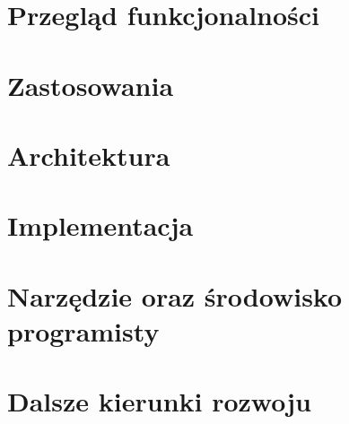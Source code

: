 \documentclass[a4paper]{article}
\begin{document}
\section{Przegląd funkcjonalności}

\section{Zastosowania}

\section{Architektura}

\section{Implementacja}

\section{Narzędzie oraz środowisko programisty}

\section{Dalsze kierunki rozwoju}
\end{document}
